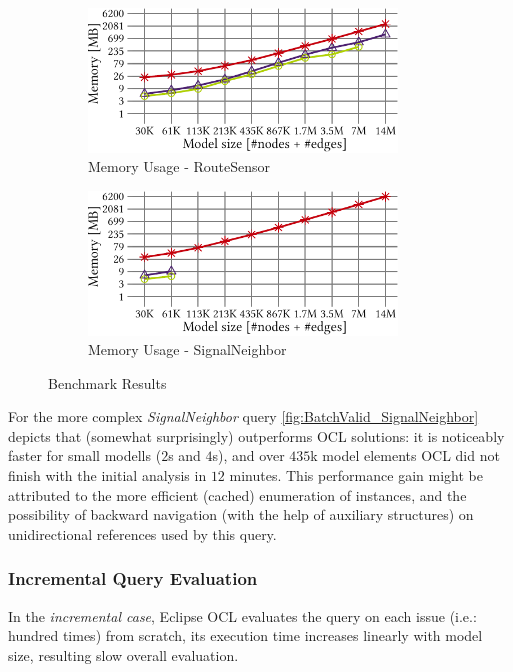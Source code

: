 \begin{figure}[ht]
\begin{center}
	\begin{subfigure}[t]{0.48\textwidth}\centering
	    \includegraphics[width=0.9\textwidth]{figures/trainBenchmark_User_Memory_RouteSensor}
	    \caption{Memory Usage - RouteSensor}
	    \label{fig:Memory_RouteSensor}
	\end{subfigure}
	\begin{subfigure}[t]{0.48\textwidth}\centering
	    \includegraphics[width=0.9\textwidth]{figures/trainBenchmark_User_Memory_SignalNeighbor}
	    \caption{Memory Usage - SignalNeighbor}
	    \label{fig:Memory_SignalNeighbor}
	\end{subfigure}
  \caption{Benchmark Results}
  \label{fig:trainbenchmark-diagrams}
\end{center}
\end{figure}

For the more complex \emph{SignalNeighbor} query
\autoref{fig:BatchValid_SignalNeighbor} depicts that \incquery{} (somewhat
surprisingly) outperforms OCL solutions: it is noticeably faster for small
modells ($2$s and $4$s), and over $435$k model elements OCL did not finish with
the initial analysis in $12$ minutes. This performance gain might be attributed to
the more efficient (cached) enumeration of instances, and the possibility of
backward navigation (with the help of auxiliary structures) on unidirectional
references used by this query.

\subsubsection{Incremental Query Evaluation}
In the \emph{incremental case}, Eclipse OCL evaluates the query on each issue
(i.e.: hundred times) from scratch, its execution time increases linearly with
model size, resulting slow overall evaluation.

